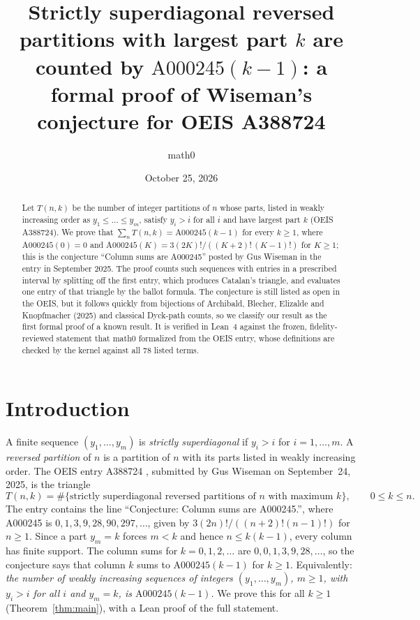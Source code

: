 \documentclass[11pt]{amsart}
\title[Column sums of OEIS A388724]{Strictly superdiagonal reversed partitions with largest part $k$ are counted by $\mathrm{A000245}(k-1)$: a formal proof of Wiseman's conjecture for OEIS A388724}
\author{math0}
\date{October 25, 2026}
\theoremstyle{plain}
\theoremstyle{definition}
\begin{document}
\begin{abstract}
Let $T(n,k)$ be the number of integer partitions of $n$ whose parts, listed in weakly increasing order as $y_1\le\dots\le y_m$, satisfy $y_i>i$ for all $i$ and have largest part $k$ (OEIS A388724).
We prove that $\sum_{n}T(n,k)=\mathrm{A000245}(k-1)$ for every $k\ge1$, where $\mathrm{A000245}(0)=0$ and $\mathrm{A000245}(K)=3(2K)!/((K+2)!\,(K-1)!)$ for $K\ge1$; this is the conjecture ``Column sums are A000245'' posted by Gus Wiseman in the entry in September 2025.
The proof counts such sequences with entries in a prescribed interval by splitting off the first entry, which produces Catalan's triangle, and evaluates one entry of that triangle by the ballot formula.
The conjecture is still listed as open in the OEIS, but it follows quickly from bijections of Archibald, Blecher, Elizalde and Knopfmacher (2025) and classical Dyck-path counts, so we classify our result as the first formal proof of a known result.
It is verified in Lean~4 against the frozen, fidelity-reviewed statement that math0 formalized from the OEIS entry, whose definitions are checked by the kernel against all $78$ listed terms.
\end{abstract}
\maketitle

\section{Introduction}

A finite sequence $(y_1,\dots,y_m)$ is \emph{strictly superdiagonal} if $y_i>i$ for $i=1,\dots,m$. A \emph{reversed partition} of $n$ is a partition of $n$ with its parts listed in weakly increasing order. The OEIS entry A388724 \cite{A388724}, submitted by Gus Wiseman on September~24, 2025, is the triangle
\[
  T(n,k)=\#\{\text{strictly superdiagonal reversed partitions of $n$ with maximum $k$}\},\qquad 0\le k\le n .
\]
The entry contains the line ``Conjecture: Column sums are A000245.'', where A000245 \cite{A000245} is $0,1,3,9,28,90,297,\dots$, given by $3(2n)!/((n+2)!(n-1)!)$ for $n\ge1$. Since a part $y_m=k$ forces $m<k$ and hence $n\le k(k-1)$, every column has finite support. The column sums for $k=0,1,2,\dots$ are $0,0,1,3,9,28,\dots$, so the conjecture says that column $k$ sums to $\mathrm{A000245}(k-1)$ for $k\ge1$. Equivalently: \emph{the number of weakly increasing sequences of integers $(y_1,\dots,y_m)$, $m\ge1$, with $y_i>i$ for all $i$ and $y_m=k$, is $\mathrm{A000245}(k-1)$.} We prove this for all $k\ge1$ (Theorem~\ref{thm:main}), with a Lean proof of the full statement.
\end{document}
